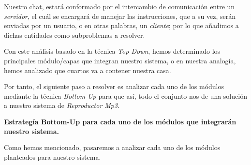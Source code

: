 \documentclass[10pt,letterpaper]{report}
\begin{document}
\vspace{0.5cm}

\noindent Nuestro chat, estará conformado por el intercambio de comunicación entre un \textit{servidor}, el cuál se encargará de manejar las instrucciones, que a su vez, serán enviadas por un usuario, o en otras palabras, un \textit{cliente}; por lo que añadimos a dichas entidades como subproblemas a resolver.

\vspace{0.5cm}

\noindent Con este análisis basado en la técnica \textit{Top-Down}, hemos determinado los principales módulo/capas que integran nuestro sistema, o en nuestra analogía, hemos analizado que cuartos va a contener nuestra casa.

\vspace{0.2cm}

\noindent Por tanto, el siguiente paso a resolver es analizar cada uno de los módulos mediante la técnica \textit{Bottom-Up} para que así, todo el conjunto nos de una solución a nuestro sistema de \textit{Reproductor Mp3}.

\vspace{0.5cm}

\noindent \textbf{Estrategía Bottom-Up para cada uno de los módulos que integrarán nuestro sistema.}

\noindent Como hemos mencionado, pasaremos a analizar cada uno de los módulos planteados para nuestro sistema.
\end{document}
